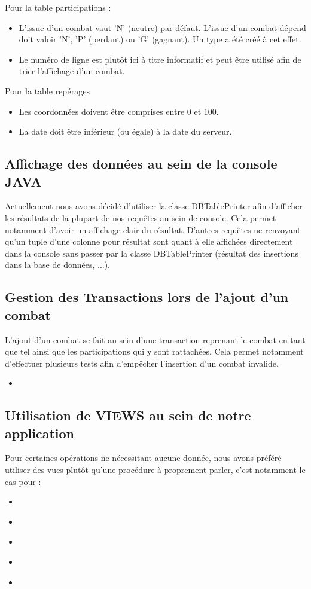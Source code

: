 \documentclass{article}[12pt]
\newcommand{\SQLcode}[2]{
	\begin{itemize}
		\item[]
	\end{itemize}
}
\newcommand{\Javacode}[2]{
	\begin{itemize}
    	\item[]
	\end{itemize}
}
\begin{document}
	Pour la table participations :
	\begin{itemize}
		\item L'issue d'un combat vaut 'N' (neutre) par défaut. L'issue d'un combat dépend doit valoir 'N', 'P' (perdant) ou 'G' (gagnant). Un type a été créé à cet effet.
		\item Le numéro de ligne est plutôt ici à titre informatif et peut être utilisé afin de trier l'affichage d'un combat.
	\end{itemize}
	Pour la table repérages
	\begin{itemize}
		\item Les coordonnées doivent être comprises entre 0 et 100.
		\item La date doit être inférieur (ou égale) à la date du serveur.
	\end{itemize}
	\subsection{Affichage des données au sein de la console JAVA}
	Actuellement nous avons décidé d'utiliser la classe \href{https://github.com/htorun/dbtableprinter}{DBTablePrinter} afin d'afficher les résultats de la plupart de nos requêtes au sein de console. Cela permet notamment d'avoir un affichage clair du résultat. D'autres requêtes ne renvoyant qu'un tuple d'une colonne pour résultat sont quant à elle affichées directement dans la console sans passer par la classe DBTablePrinter (résultat des insertions dans la base de données, ...).
    \subsection{Gestion des Transactions lors de l'ajout d'un combat}
    L'ajout d'un combat se fait au sein d'une transaction reprenant le combat en tant que tel ainsi que les participations qui y sont rattachées. Cela permet notamment d'effectuer plusieurs tests afin d'empêcher l'insertion d'un combat invalide.
   	\Javacode{transaction}{Utilisation d'une transaction pour l'ajout d'un combat}
    \subsection{Utilisation de VIEWS au sein de notre application}
    Pour certaines opérations ne nécessitant aucune donnée, nous avons préféré utiliser des vues plutôt qu'une procédure à proprement parler, c'est notamment le cas pour : 
    \SQLcode{perte_visibilite}{Obtenir les informations sur tous les héros n'ayant pas été aperçu depuis plus de dix jours}
    \newpage
    \SQLcode{zone_conflit}{Lister les zones potentielles de conflit}
    \SQLcode{classement_victoires}{Obtenir un classement des héros en fonction de leurs victoires}
    \SQLcode{classement_defaites}{Obtenir un classement des héros en fonction de leurs défaites}
    \newpage
   \SQLcode{classement_reperages}{Obtenir un classement des héros en fonction de leurs repérages}
   
\end{document}
